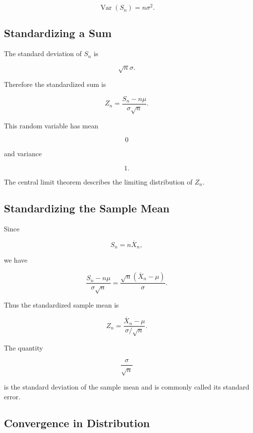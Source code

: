 \[
\boxed{
\operatorname{Var}(S_n)
=
n\sigma^2.
}
\]

\subsection{Standardizing a Sum}
\label{subsec:standardizing-sum-clt}

The standard deviation of \(S_n\) is

\[
\sqrt{n}\sigma.
\]

Therefore the standardized sum is

\[
\boxed{
Z_n
=
\frac{
S_n-n\mu
}{
\sigma\sqrt{n}
}.
}
\]

This random variable has mean

\[
0
\]

and variance

\[
1.
\]

The central limit theorem describes the limiting distribution of
\(Z_n\).

\subsection{Standardizing the Sample Mean}
\label{subsec:standardizing-sample-mean-clt}

Since

\[
S_n=n\overline{X}_n,
\]

we have

\[
\frac{
S_n-n\mu
}{
\sigma\sqrt{n}
}
=
\frac{
\sqrt{n}
(\overline{X}_n-\mu)
}{
\sigma
}.
\]

Thus the standardized sample mean is

\[
\boxed{
Z_n
=
\frac{
\overline{X}_n-\mu
}{
\sigma/\sqrt{n}
}.
}
\]

The quantity

\[
\boxed{
\frac{\sigma}{\sqrt{n}}
}
\]

is the standard deviation of the sample mean and is commonly called its
standard error.

\subsection{Convergence in Distribution}
\label{subsec:convergence-in-distribution-clt}

